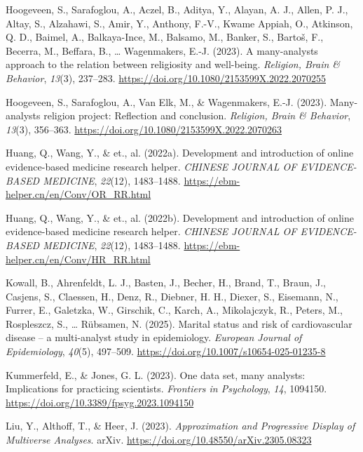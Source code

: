 \documentclass[
  man,
  floatsintext,
  longtable,
  nolmodern,
  notxfonts,
  notimes,
  colorlinks=true,linkcolor=blue,citecolor=blue,urlcolor=blue]{apa7}
\newlength{\cslhangindent}
\newenvironment{CSLReferences}[2] %
 {\begin{list}{}{%
  \setlength{\itemindent}{0pt}
  \setlength{\leftmargin}{0pt}
  \setlength{\parsep}{0pt}
  \ifodd #1
   \setlength{\leftmargin}{\cslhangindent}
   \setlength{\itemindent}{-1\cslhangindent}
  \fi
  \setlength{\itemsep}{#2\baselineskip}}}
 {\end{list}}
\begin{document}
\begin{CSLReferences}{1}{0}
Hoogeveen, S., Sarafoglou, A., Aczel, B., Aditya, Y., Alayan, A. J.,
Allen, P. J., Altay, S., Alzahawi, S., Amir, Y., Anthony, F.-V., Kwame
Appiah, O., Atkinson, Q. D., Baimel, A., Balkaya-Ince, M., Balsamo, M.,
Banker, S., Bartoš, F., Becerra, M., Beffara, B., \ldots{} Wagenmakers,
E.-J. (2023). A many-analysts approach to the relation between
religiosity and well-being. \emph{Religion, Brain \& Behavior},
\emph{13}(3), 237--283.
\url{https://doi.org/10.1080/2153599X.2022.2070255}

Hoogeveen, S., Sarafoglou, A., Van Elk, M., \& Wagenmakers, E.-J.
(2023). Many-analysts religion project: Reflection and conclusion.
\emph{Religion, Brain \& Behavior}, \emph{13}(3), 356--363.
\url{https://doi.org/10.1080/2153599X.2022.2070263}

Huang, Q., Wang, Y., \& et., al. (2022a). Development and introduction
of online evidence-based medicine research helper. \emph{CHINESE JOURNAL
OF EVIDENCE-BASED MEDICINE}, \emph{22}(12), 1483--1488.
\url{https://ebm-helper.cn/en/Conv/OR_RR.html}

Huang, Q., Wang, Y., \& et., al. (2022b). Development and introduction
of online evidence-based medicine research helper. \emph{CHINESE JOURNAL
OF EVIDENCE-BASED MEDICINE}, \emph{22}(12), 1483--1488.
\url{https://ebm-helper.cn/en/Conv/HR_RR.html}

Kowall, B., Ahrenfeldt, L. J., Basten, J., Becher, H., Brand, T., Braun,
J., Casjens, S., Claessen, H., Denz, R., Diebner, H. H., Diexer, S.,
Eisemann, N., Furrer, E., Galetzka, W., Girschik, C., Karch, A.,
Mikolajczyk, R., Peters, M., Rospleszcz, S., \ldots{} Rübsamen, N.
(2025). Marital status and risk of cardiovascular disease -- a
multi-analyst study in epidemiology. \emph{European Journal of
Epidemiology}, \emph{40}(5), 497--509.
\url{https://doi.org/10.1007/s10654-025-01235-8}

Kummerfeld, E., \& Jones, G. L. (2023). One data set, many analysts:
{Implications} for practicing scientists. \emph{Frontiers in
Psychology}, \emph{14}, 1094150.
\url{https://doi.org/10.3389/fpsyg.2023.1094150}

Liu, Y., Althoff, T., \& Heer, J. (2023). \emph{Approximation and
{Progressive} {Display} of {Multiverse} {Analyses}}. arXiv.
\url{https://doi.org/10.48550/arXiv.2305.08323}


\end{CSLReferences}
\end{document}
